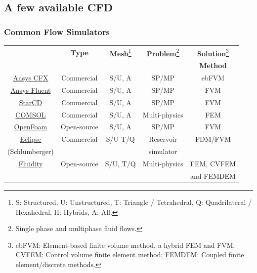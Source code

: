 \documentclass[10pt,compress]{beamer}
\begin{document}
\subsection{A few available CFD}  
\begin{frame}
 \frametitle{Common Flow Simulators}
\begin{center}
\begin{tabular}{||c|| c | c | c | c ||}
\hline\hline
                   & {\bf Type}  & 
{\bf Mesh}\footnote{S: Structured, U: Unstructured, T: Triangle / Tetrahedral, Q: Quadrilateral / Hexahedral, H: Hybrids, A: All.} & 
{\bf Problem}\footnote{Single phase and multiphase fluid flows.} & 
{\bf Solution}\footnote{ebFVM: Element-based finite volume method, a hybrid FEM and FVM; CVFEM: Control volume finite element method; FEMDEM: Coupled finite element/discrete methods.} \\
                   &             &            &               & {\bf Method}   \\
\hline\hline
\href{http://www.ansys.com/Products/Simulation+Technology/Fluid+Dynamics/Fluid+Dynamics+Products/ANSYS+CFX}
{Ansys CFX}          & Commercial  &  S/U, A    &   SP/MP  & ebFVM \\
\hline
\href{http://www.ansys.com/Products/Simulation+Technology/Fluid+Dynamics/Fluid+Dynamics+Products/ANSYS+Fluent}
{Ansys Fluent}       & Commercial  & S/U, A    &   SP/MP     & FVM           \\
\hline
\href{http://www.cd-adapco.com}
{StarCD}             & Commercial  & S/U, A    &   SP/MP     & FVM  \\ 
\hline
\href{http://www.uk.comsol.com/}
{COMSOL}            & Commercial   & S/U, A    &  Multi-physics & FEM \\
\hline
\href{http://www.openfoam.com/} 
{OpenFoam} & Open-source & S/U, A & SP/MP & FVM \\
\hline
\href{http://www.software.slb.com/products/foundation/pages/eclipse.aspx}
{Eclipse}  & Commercial & S/U T/Q    & Reservoir  &FDM/FVM \\
(Schlumberger)&         &            & simulator  &        \\
\hline
\href{http://www3.imperial.ac.uk/earthscienceandengineering/research/amcg/fluidity}
{Fluidity}             & Open-source & S/U, T/Q   & Multi-physics & FEM, CVFEM \\
                        &            &            &               & and FEMDEM \\

\hline\hline
\end{tabular}
 
\end{center}

\end{frame}
\end{document}
